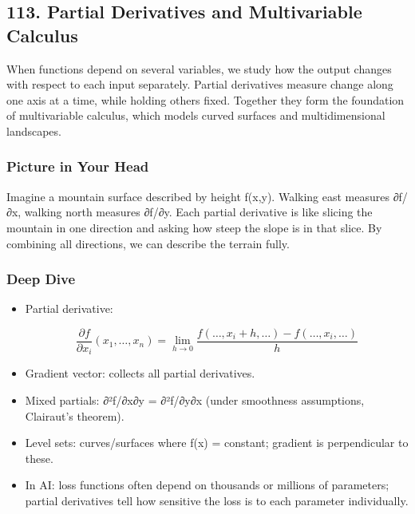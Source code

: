 \documentclass[
  letterpaper,
  DIV=11,
  numbers=noendperiod]{scrreprt}
\begin{document}
\subsection{113. Partial Derivatives and Multivariable
Calculus}\label{partial-derivatives-and-multivariable-calculus}

When functions depend on several variables, we study how the output
changes with respect to each input separately. Partial derivatives
measure change along one axis at a time, while holding others fixed.
Together they form the foundation of multivariable calculus, which
models curved surfaces and multidimensional landscapes.

\subsubsection{Picture in Your Head}\label{picture-in-your-head-112}

Imagine a mountain surface described by height f(x,y). Walking east
measures ∂f/∂x, walking north measures ∂f/∂y. Each partial derivative is
like slicing the mountain in one direction and asking how steep the
slope is in that slice. By combining all directions, we can describe the
terrain fully.

\subsubsection{Deep Dive}\label{deep-dive-112}

\begin{itemize}
\item
  Partial derivative:

  \[
  \frac{\partial f}{\partial x_i}(x_1,\dots,x_n) = \lim_{h \to 0}\frac{f(\dots,x_i+h,\dots) - f(\dots,x_i,\dots)}{h}
  \]
\item
  Gradient vector: collects all partial derivatives.
\item
  Mixed partials: ∂²f/∂x∂y = ∂²f/∂y∂x (under smoothness assumptions,
  Clairaut's theorem).
\item
  Level sets: curves/surfaces where f(x) = constant; gradient is
  perpendicular to these.
\item
  In AI: loss functions often depend on thousands or millions of
  parameters; partial derivatives tell how sensitive the loss is to each
  parameter individually.
\end{itemize}
\end{document}
